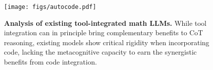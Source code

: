 
\begin{figure}[t]
    \centering %
    \texttt{[image: figs/autocode.pdf]} %
    \caption{\small \textbf{Analysis of existing tool-integrated math LLMs.} \small While tool integration can in principle bring complementary benefits to CoT reasoning, existing models show critical rigidity when incorporating code, lacking the metacognitive capacity to earn the synergistic benefits from code integration.  } 
    \label{fig_analysis} 
    \vspace{-0.2cm}
\end{figure}
